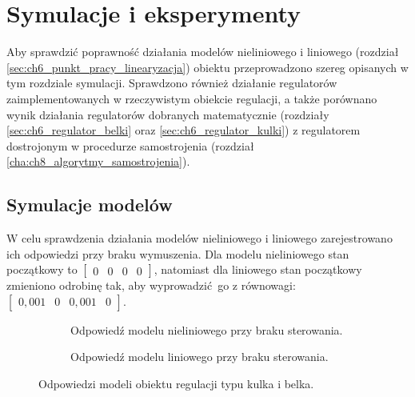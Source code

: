 \chapter{Symulacje i eksperymenty}
\label{cha:ch9_symulacje_i_eksperymenty}

Aby sprawdzić poprawność działania modelów nieliniowego i liniowego (rozdział \ref{sec:ch6_punkt_pracy_linearyzacja}) obiektu przeprowadzono szereg opisanych w tym rozdziale symulacji. Sprawdzono również działanie regulatorów zaimplementowanych w rzeczywistym obiekcie regulacji, a także porównano wynik działania regulatorów dobranych matematycznie (rozdziały \ref{sec:ch6_regulator_belki} oraz \ref{sec:ch6_regulator_kulki}) z regulatorem dostrojonym w procedurze samostrojenia (rozdział \ref{cha:ch8_algorytmy_samostrojenia}).

\section{Symulacje modelów}
\label{sec:ch9_symulacje_modelow}

W celu sprawdzenia działania modelów nieliniowego i liniowego zarejestrowano ich odpowiedzi przy braku wymuszenia. Dla modelu nieliniowego stan początkowy to $\begin{bmatrix}
0 & 0 & 0 & 0
\end{bmatrix}$, natomiast dla liniowego stan początkowy zmieniono odrobinę tak, aby wyprowadzić go z równowagi: $\begin{bmatrix}
0,001 & 0 & 0,001 & 0
\end{bmatrix}$.

\begin{sidewaysfigure}
    \centering
    \begin{subfigure}[b]{0.49\textwidth}
        
        \caption{Odpowiedź modelu nieliniowego przy braku sterowania.}
        \label{fig:odpowiedz_modelu_nieliniowego_brak_sterowania}
    \end{subfigure}
    \begin{subfigure}[b]{0.49\textwidth}
        
        \caption{Odpowiedź modelu liniowego przy braku sterowania.}
        \label{fig:odpowiedz_modelu_liniowego_brak_sterowania}
    \end{subfigure}
    
    \caption{Odpowiedzi modeli obiektu regulacji typu kulka i belka.}\label{fig:odpowiedzi_modeli}
\end{sidewaysfigure}

